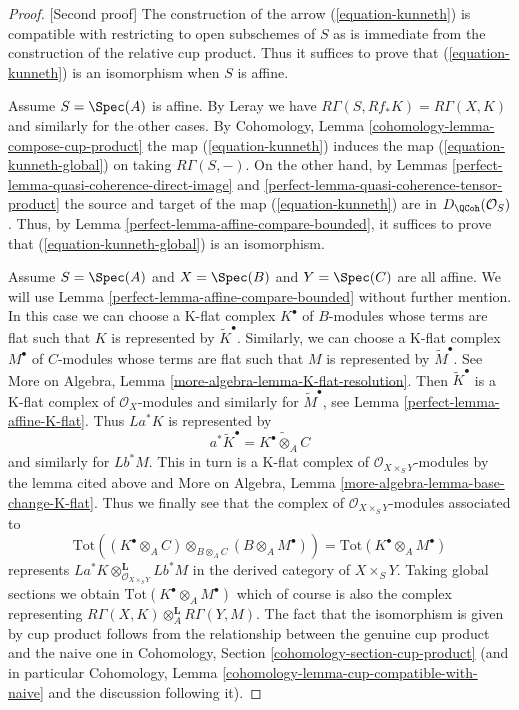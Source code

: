 \begin{proof}
[Second proof]
The construction of the arrow (\ref{equation-kunneth}) is compatible
with restricting to open subschemes of $S$ as is immediate from the
construction of the relative cup product. Thus it suffices to prove
that (\ref{equation-kunneth}) is an isomorphism when $S$ is affine.

\medskip\noindent
Assume $S = \Spec(A)$ is affine. By Leray we have
$R\Gamma(S, Rf_*K) = R\Gamma(X, K)$ and similarly for the
other cases. By Cohomology, Lemma \ref{cohomology-lemma-compose-cup-product}
the map (\ref{equation-kunneth}) induces the map
(\ref{equation-kunneth-global}) on taking $R\Gamma(S, -)$.
On the other hand, by
Lemmas \ref{perfect-lemma-quasi-coherence-direct-image} and
\ref{perfect-lemma-quasi-coherence-tensor-product}
the source and target of the map
(\ref{equation-kunneth}) are in $D_\QCoh(\mathcal{O}_S)$.
Thus, by Lemma \ref{perfect-lemma-affine-compare-bounded}, it suffices to prove that
(\ref{equation-kunneth-global}) is an isomorphism.

\medskip\noindent
Assume $S = \Spec(A)$ and $X = \Spec(B)$ and $Y = \Spec(C)$ are all affine.
We will use Lemma \ref{perfect-lemma-affine-compare-bounded} without further mention.
In this case we can choose a K-flat complex $K^\bullet$ of $B$-modules
whose terms are flat such that $K$ is represented by $\widetilde{K}^\bullet$.
Similarly, we can choose a K-flat complex $M^\bullet$ of $C$-modules
whose terms are flat such that $M$ is represented by $\widetilde{M}^\bullet$.
See More on Algebra, Lemma \ref{more-algebra-lemma-K-flat-resolution}.
Then $\widetilde{K}^\bullet$ is a K-flat complex of $\mathcal{O}_X$-modules
and similarly for $\widetilde{M}^\bullet$, see
Lemma \ref{perfect-lemma-affine-K-flat}. Thus
$La^*K$ is represented by
$$
a^*\widetilde{K}^\bullet = \widetilde{K^\bullet \otimes_A C}
$$
and similarly for $Lb^*M$. This in turn is a K-flat complex
of $\mathcal{O}_{X \times_S Y}$-modules by the lemma cited above
and More on Algebra, Lemma \ref{more-algebra-lemma-base-change-K-flat}.
Thus we finally see that the complex of
$\mathcal{O}_{X \times_S Y}$-modules associated to
$$
\text{Tot}((K^\bullet \otimes_A C) \otimes_{B \otimes_A C}
(B \otimes_A M^\bullet)) =
\text{Tot}(K^\bullet \otimes_A M^\bullet)
$$
represents $La^*K \otimes_{\mathcal{O}_{X \times_S Y}}^\mathbf{L} Lb^*M$
in the derived category of $X \times_S Y$. Taking global sections
we obtain $\text{Tot}(K^\bullet \otimes_A M^\bullet)$ which of course
is also the complex representing
$R\Gamma(X, K) \otimes_A^\mathbf{L} R\Gamma(Y, M)$.
The fact that the isomorphism is given by cup product follows from the
relationship between the genuine cup product and the naive one
in Cohomology, Section \ref{cohomology-section-cup-product}
(and in particular
Cohomology, Lemma \ref{cohomology-lemma-cup-compatible-with-naive}
and the discussion following it).


\end{proof}

